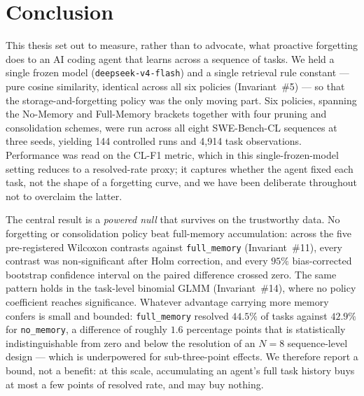 

\section{Conclusion}

This thesis set out to measure, rather than to advocate, what proactive forgetting
does to an AI coding agent that learns across a sequence of tasks. We held a single
frozen model (\texttt{deepseek-v4-flash}) and a single retrieval rule constant --- pure
cosine similarity, identical across all six policies (Invariant~\#5) --- so that the
storage-and-forgetting policy was the only moving part. Six policies, spanning the
No-Memory and Full-Memory brackets together with four pruning and consolidation schemes,
were run across all eight SWE-Bench-CL sequences at three seeds, yielding 144 controlled
runs and 4{,}914 task observations. Performance was read on the CL-F1 metric, which in
this single-frozen-model setting reduces to a resolved-rate proxy; it captures whether the
agent fixed each task, not the shape of a forgetting curve, and we have been deliberate
throughout not to overclaim the latter.

The central result is a \emph{powered null} that survives on the trustworthy data. No
forgetting or consolidation policy beat full-memory accumulation: across the five
pre-registered Wilcoxon contrasts against \texttt{full\_memory} (Invariant~\#11), every
contrast was non-significant after Holm correction, and every $95\%$ bias-corrected
bootstrap confidence interval on the paired difference crossed zero. The same pattern
holds in the task-level binomial GLMM (Invariant~\#14), where no policy coefficient
reaches significance. Whatever advantage carrying more memory confers is small and
bounded: \texttt{full\_memory} resolved $44.5\%$ of tasks against $42.9\%$ for
\texttt{no\_memory}, a difference of roughly $1.6$ percentage points that is statistically
indistinguishable from zero and below the resolution of an $N=8$ sequence-level design ---
which is underpowered for sub-three-point effects. We therefore report a bound, not a
benefit: at this scale, accumulating an agent's full task history buys at most a few points
of resolved rate, and may buy nothing.

